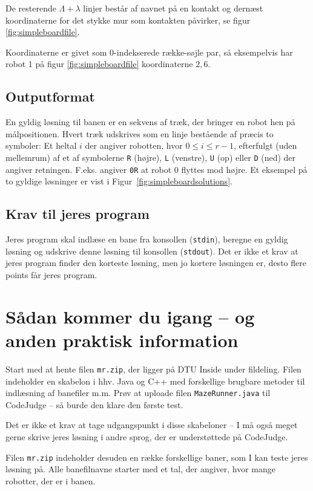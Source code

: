 \documentclass[10pt, a4paper]{article}
\begin{document}
De resterende $\Lambda+\lambda$ linjer består af navnet på en kontakt og dernæst koordinaterne for det stykke mur som kontakten påvirker, se figur \ref{fig:simpleboardfile}.

Koordinaterne er givet som 0-indekserede række-søjle par, så eksempelvis har robot 1 på figur \ref{fig:simpleboardfile} koordinaterne $2, 6$.

\subsection{Outputformat}
En gyldig løsning til banen er en sekvens af træk, der bringer en robot hen på målpositionen.
Hvert træk udskrives som en linje bestående af præcis to symboler: Et heltal $i$ der angiver robotten, hvor $0 \leq i \leq r-1$, efterfulgt (uden mellemrum) af et af symbolerne \texttt{R} (højre), \texttt{L} (venstre), \texttt{U} (op) eller \texttt{D} (ned) der angiver retningen.
F.eks. angiver \texttt{0R} at robot 0 flyttes mod højre. Et eksempel på to gyldige løsninger er vist i Figur~\ref{fig:simpleboardsolutions}.

\subsection{Krav til jeres program}
Jeres program skal indlæse en bane fra konsollen (\texttt{stdin}), beregne en gyldig løsning og udskrive denne løsning til konsollen (\texttt{stdout}).
Det er ikke et krav at jeres program finder den korteste løsning, men jo kortere løsningen er, desto flere points får jeres program.

\section{Sådan kommer du igang -- og anden praktisk information}
Start med at hente filen \texttt{mr.zip}, der ligger på DTU Inside under fildeling.
Filen indeholder en skabelon i hhv. Java og C++ med forskellige brugbare metoder til indlæsning af banefiler m.m.
Prøv at uploade filen \texttt{MazeRunner.java} til CodeJudge -- så burde den klare den første test.

Det er ikke et krav at tage udgangspunkt i disse skabeloner -- I må også meget gerne skrive jeres løsning i andre sprog, der er understøttede på CodeJudge.

Filen \texttt{mr.zip} indeholder desuden en række forskellige baner, som I kan teste jeres løsning på.
Alle banefilnavne starter med et tal, der angiver, hvor mange robotter, der er i banen.
\end{document}
